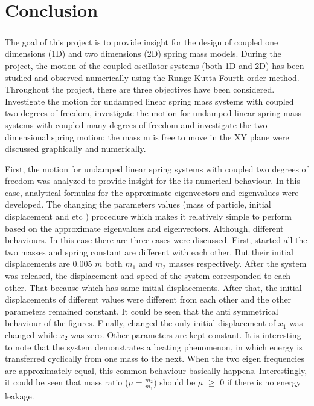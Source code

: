 \chapter{Conclusion}
\label{chap:06}

\paragraph{}

The goal of this project is to provide insight for the design of coupled one dimensions (1D) and two dimensions (2D) spring mass models. During the project, the motion of the coupled oscillator systems (both 1D and 2D) has been studied  and observed numerically using the Runge Kutta Fourth order method. Throughout the project, there are three objectives have been considered. Investigate the motion for undamped linear spring mass systems with coupled two degrees of freedom, investigate the motion for undamped linear spring mass systems with coupled many degrees of freedom and investigate the two-dimensional spring motion: the mass m is free to move in the XY plane were discussed graphically and numerically.

First, the motion for undamped linear spring systems with coupled two degrees of freedom was analyzed to provide insight for the its numerical behaviour. In this case, analytical formulas for the approximate eigenvectors and eigenvalues were developed. The changing the parameters values (mass of particle, initial displacement and etc )
procedure which makes it relatively simple to perform based on the approximate eigenvalues and eigenvectors. Although, different behaviours. In this case there are three cases were discussed. First, started all the two masses and spring constant are different with each other. But their initial displacements are 0.005 $m$ both $m_1$ and $m_2$ masses respectively. After the system was released, the displacement and speed of the system corresponded to each other. That because which has same initial displacements. After that, the initial displacements of different values were different from each other and the other parameters remained constant. It could be seen that the anti symmetrical behaviour of the figures. Finally, changed the only initial displacement of $x_1$ was changed while $x_2$ was zero.  Other parameters are kept constant. It is interesting to note that
the system demonstrates a beating phenomenon, in which energy is transferred cyclically from one mass to the next. When the two eigen frequencies are approximately equal, this common behaviour basically happens. Interestingly, it could be seen that  mass ratio ($\mu = \frac{m_2}{m_1}$) should be $\mu$ $\geq$ 0 if there is no energy leakage. 

